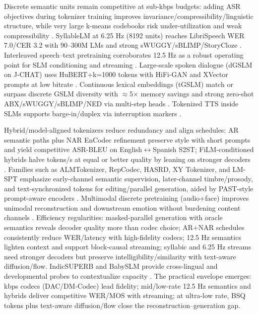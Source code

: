 \documentclass{article}
\begin{document}
Discrete semantic units remain competitive at sub-kbps budgets: adding ASR objectives during tokenizer training improves invariance/compressibility/linguistic structure, while very large k-means codebooks risk under-utilization and weak compressibility \cite{vashishth2024stabspeechtokenizerassessmentbenchmark}. SyllableLM at 6.25 Hz (8192 units) reaches LibriSpeech WER 7.0/CER 3.2 with 90--300M LMs and strong sWUGGY/sBLIMP/StoryCloze \cite{baade2024syllablelmlearningcoarsesemanticunitsspe}. Interleaved speech--text pretraining corroborates 12.5 Hz as a robust operating point for SLM conditioning and streaming \cite{zeng2024scalingspeechtextpretrainingsyntheticint}. Large-scale spoken dialogue (dGSLM on J-CHAT) uses HuBERT+k=1000 tokens with HiFi-GAN and XVector prompts at low bitrate \cite{nakata2024jchatjapaneselargescalespokendialoguecor}. Continuous lexical embeddings (tGSLM) match or surpass discrete GSLM diversity with $\approx$5$\times$ memory savings and strong zero-shot ABX/sWUGGY/sBLIMP/NED via multi-step heads \cite{algayres2023generativespokenlanguagemodelbasedcontin}. Tokenized TTS inside SLMs supports barge-in/duplex via interruption markers \cite{ma2024languagemodelcanlistenwhilespeaking}.

Hybrid/model-aligned tokenizers reduce redundancy and align schedules: AR semantic paths plus NAR EnCodec refinement preserve style with short prompts and yield competitive ASR-BLEU on English$\leftrightarrow$Spanish S2ST; FiLM-conditioned hybrids halve tokens/s at equal or better quality by leaning on stronger decoders \cite{peng2024mslms2stmultitaskspeechlanguagemodeltext,yang2025diffsoundstreamefficientspeechtokenizati}. Families such as ALMTokenizer, RepCodec, HASRD, XY Tokenizer, and LM-SPT emphasize early-channel semantic supervision, later-channel timbre/prosody, and text-synchronized tokens for editing/parallel generation, aided by PAST-style prompt-aware encoders \cite{guo2025recentadvancesdiscretespeechtokensreview}. Multimodal discrete pretraining (audio+face) improves unimodal reconstruction and downstream emotion without burdening content channels \cite{sadok2025vectorquantizedmaskedautoencoderaudiovis}. Efficiency regularities: masked-parallel generation with oracle semantics reveals decoder quality more than codec choice; AR+NAR schedules consistently reduce WER/latency with high-fidelity codecs; 12.5 Hz semantics lighten context and support block-causal streaming; syllabic and 6.25 Hz streams need stronger decoders but preserve intelligibility/similarity with text-aware diffusion/flow. IndicSUPERB and BabySLM provide cross-lingual and developmental probes to contextualize capacity \cite{fily2024establishingdegreesclosenessbetweenaudio,lavechin2023babyslmlanguageacquisitionfriendlybenchm,entry2025indicsuperbspeechprocessinguniversalperf}. The practical envelope emerges: kbps codecs (DAC/DM-Codec) lead fidelity; mid/low-rate 12.5 Hz semantics and hybrids deliver competitive WER/MOS with streaming; at ultra-low rate, BSQ tokens plus text-aware diffusion/flow close the reconstruction--generation gap.
\end{document}
